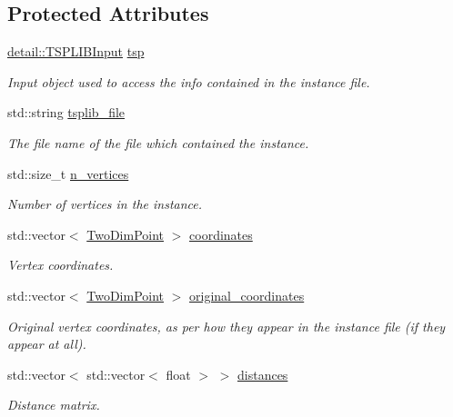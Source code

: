 \subsection*{Protected Attributes}
\begin{DoxyCompactItemize}
\item 
\hyperlink{classas_1_1tsplib_1_1detail_1_1TSPLIBInput}{detail\+::\+T\+S\+P\+L\+I\+B\+Input} \hyperlink{classas_1_1tsplib_1_1TSPInstance_a6a73219aae354011c905255dc687122b}{tsp}
\begin{DoxyCompactList}\small\item\em Input object used to access the info contained in the instance file. \end{DoxyCompactList}\item 
std\+::string \hyperlink{classas_1_1tsplib_1_1TSPInstance_a6b2d4d7ad5e12825ceee49d32cdc28af}{tsplib\+\_\+file}
\begin{DoxyCompactList}\small\item\em The file name of the file which contained the instance. \end{DoxyCompactList}\item 
std\+::size\+\_\+t \hyperlink{classas_1_1tsplib_1_1TSPInstance_af62c22d7f09f0264f5e817268230cec9}{n\+\_\+vertices}
\begin{DoxyCompactList}\small\item\em Number of vertices in the instance. \end{DoxyCompactList}\item 
std\+::vector$<$ \hyperlink{structas_1_1TwoDimPoint}{Two\+Dim\+Point} $>$ \hyperlink{classas_1_1tsplib_1_1TSPInstance_ad8e74403f222f9470bf320e5749e6d9a}{coordinates}
\begin{DoxyCompactList}\small\item\em Vertex coordinates. \end{DoxyCompactList}\item 
std\+::vector$<$ \hyperlink{structas_1_1TwoDimPoint}{Two\+Dim\+Point} $>$ \hyperlink{classas_1_1tsplib_1_1TSPInstance_a9302433a12f60203d11f7af163f56fee}{original\+\_\+coordinates}
\begin{DoxyCompactList}\small\item\em Original vertex coordinates, as per how they appear in the instance file (if they appear at all). \end{DoxyCompactList}\item 
std\+::vector$<$ std\+::vector$<$ float $>$ $>$ \hyperlink{classas_1_1tsplib_1_1TSPInstance_a51073058c9b3f316da6b2115a9c8bec1}{distances}
\begin{DoxyCompactList}\small\item\em Distance matrix. \end{DoxyCompactList}\end{DoxyCompactItemize}


